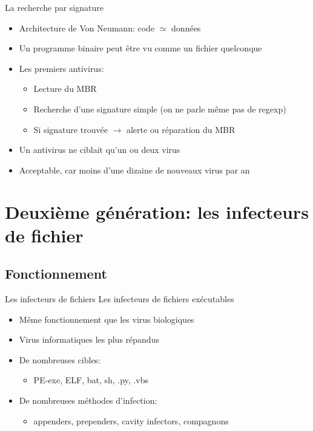 \documentclass{beamer}
\begin{document}
\begin{frame}{La recherche par signature}
\begin{itemize}
\item Architecture de Von Neumann: code $\simeq$ données
\item Un programme binaire peut être vu comme un fichier quelconque
\item Les premiers antivirus:
\begin{itemize}
\item Lecture du MBR
\item Recherche d'une signature simple (on ne parle même pas de regexp)
\item Si signature trouvée $\rightarrow$ alerte ou réparation du MBR
\end{itemize}
\item Un antivirus ne ciblait qu'un ou deux virus
\item Acceptable, car moins d'une dizaine de nouveaux virus par an
\end{itemize}
\end{frame}

\section{Deuxième génération: les infecteurs de fichier}
\subsection{Fonctionnement}

\begin{frame}{Les infecteurs de fichiers}
Les infecteurs de fichiers exécutables
\begin{itemize}
\item Même fonctionnement que les virus biologiques
\item Virus informatiques les plus répandus
\item De nombreuses cibles:
\begin{itemize}
\item PE-exe, ELF, bat, sh, .py, .vbs
\end{itemize}
\item De nombreuses méthodes d'infection:
\begin{itemize}
\item appenders, prependers, cavity infectors, compagnons
\end{itemize}
\end{itemize}
\end{frame}
\end{document}
